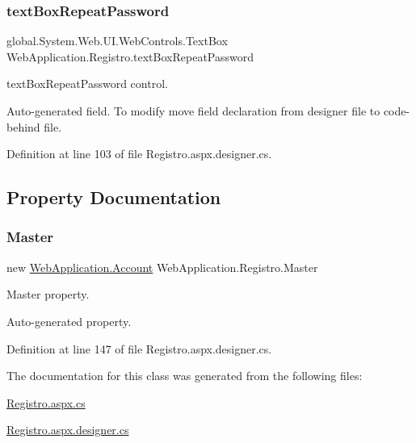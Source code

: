 \subsubsection{\texorpdfstring{textBoxRepeatPassword}{textBoxRepeatPassword}}
{\footnotesize\ttfamily global.\+System.\+Web.\+U\+I.\+Web\+Controls.\+Text\+Box Web\+Application.\+Registro.\+text\+Box\+Repeat\+Password\hspace{0.3cm}{\ttfamily [protected]}}



text\+Box\+Repeat\+Password control. 

Auto-\/generated field. To modify move field declaration from designer file to code-\/behind file. 

Definition at line 103 of file Registro.\+aspx.\+designer.\+cs.



\subsection{Property Documentation}
\mbox{\label{classWebApplication_1_1Registro_a91e9c41ae58c68f45906a1bc3cbeab8e}} 
\subsubsection{\texorpdfstring{Master}{Master}}
{\footnotesize\ttfamily new \mbox{\hyperlink{classWebApplication_1_1Account}{Web\+Application.\+Account}} Web\+Application.\+Registro.\+Master\hspace{0.3cm}{\ttfamily [get]}}



Master property. 

Auto-\/generated property. 

Definition at line 147 of file Registro.\+aspx.\+designer.\+cs.



The documentation for this class was generated from the following files\+:\begin{DoxyCompactItemize}
\item 
\mbox{\hyperlink{Registro_8aspx_8cs}{Registro.\+aspx.\+cs}}\item 
\mbox{\hyperlink{Registro_8aspx_8designer_8cs}{Registro.\+aspx.\+designer.\+cs}}\end{DoxyCompactItemize}
